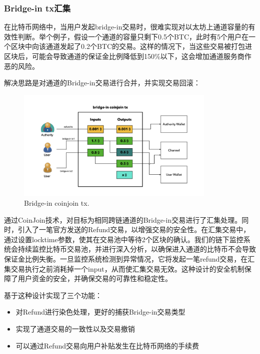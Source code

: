 \documentclass{article}
\begin{document}
\subsubsection{Bridge-in tx汇集}
\par 在比特币网络中，当用户发起bridge-in交易时，很难实现对以太坊上通道容量的有效性判断。举个例子，假设一个通道的容量只剩下0.5个BTC，此时有5个用户在一个区块中向该通道发起了0.2个BTC的交易。这样的情况下，当这些交易被打包进区块后，可能会导致通道的保证金比例降低到150\%以下，这会增加通道服务商作恶的风险。
\par 解决思路是对通道的Bridge-in交易进行合并，并实现交易回滚：
\begin{figure}[h]
\centering
\includegraphics[width=0.85\textwidth]{coinjoin.jpg}
\caption{\label{fig:coinjoin}Bridge-in coinjoin tx.}
\end{figure}
\par 通过CoinJoin技术，对目标为相同跨链通道的Bridge-in交易进行了汇集处理。同时，引入了一笔官方发送的Refund交易，以增强交易的安全性。在汇集交易中，通过设置locktime参数，使其在交易池中等待2个区块的确认。我们的链下监控系统会持续监控比特币交易池，并进行深入分析，以确保进入通道的比特币不会导致保证金比例失衡。一旦监控系统检测到异常情况，它将发起一笔refund交易，在汇集交易执行之前消耗掉一个input，从而使汇集交易无效。这种设计的安全机制保障了用户资金的安全，并确保交易的可靠性和稳定性。
\par 基于这种设计实现了三个功能：
\begin{itemize}
    \item 对Refund进行染色处理，更好的捕获Bridge-in交易类型
    \item 实现了通道交易的一致性以及交易撤销
    \item 可以通过Refund交易向用户补贴发生在比特币网络的手续费
\end{itemize}
\end{document}
